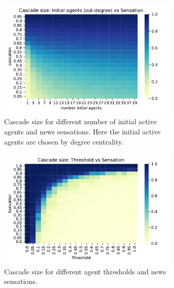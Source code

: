 \documentclass[10pt]{article}
\begin{document}
\begin{figure}
    \begin{subfigure}{0.48\textwidth}
      \centering
      \includegraphics[width=0.95\textwidth]{images/initial_sensation_out_degree.pdf}
      \caption{Cascade size for different number of initial active agents and news sensations. Here the initial active agents are chosen by degree centrality.}
      \label{fig:initial_sensation_out_degree}
    \end{subfigure}\hfill
    \begin{subfigure}{0.48\textwidth}
      \centering
      \includegraphics[width=0.95\textwidth]{images/threshold_sensation.pdf}
      \caption{Cascade size for different agent thresholds and news sensations.}
      \label{fig:threshold_sensation}
    \end{subfigure}\\
    \begin{subfigure}{0.48\textwidth}
      \centering

\end{subfigure}
\end{figure}
\end{document}
